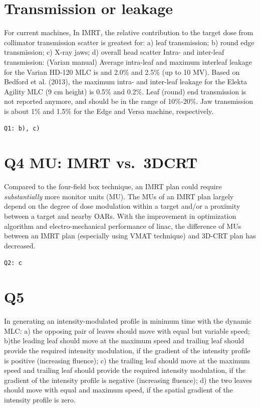 \documentclass[]{book}
\theoremstyle{definition}
\theoremstyle{definition}
\theoremstyle{definition}
\theoremstyle{remark}
\begin{document}
\section{Transmission or leakage}\label{transmission-or-leakage}

For current machines, In IMRT, the relative contribution to the target
dose from collimator transmission scatter is greatest for: a) leaf
transmission; b) round edge transmission; c) X-ray jaws; d) overall head
scatter Intra- and inter-leaf transmission: (Varian manual) Average
intra-leaf and maximum interleaf leakage for the Varian HD-120 MLC is
and 2.0\% and 2.5\% (up to 10 MV). Based on Bedford et al. (2013), the
maximum intra- and inter-leaf leakage for the Elekta Agility MLC (9 cm
height) is 0.5\% and 0.2\%. Leaf (round) end transmission is not
reported anymore, and should be in the range of 10\%-20\%. Jaw
transmission is about 1\% and 1.5\% for the Edge and Versa machine,
respectively.

\texttt{Q1:\ b),\ c)}

\section{Q4 MU: IMRT vs.~3DCRT}\label{q4-mu-imrt-vs.3dcrt}

Compared to the four-field box technique, an IMRT plan could require
\emph{substantially} more monitor units (MU). The MUs of an IMRT plan
largely depend on the degree of dose modulation within a target and/or a
proximity between a target and nearby OARs. With the improvement in
optimization algorithm and electro-mechanical performance of linac, the
difference of MUs between an IMRT plan (especially using VMAT technique)
and 3D-CRT plan has decreased.

\texttt{Q2:\ c}

\section{Q5}\label{q5}

In generating an intensity-modulated profile in minimum time with the
dynamic MLC: a) the opposing pair of leaves should move with equal but
variable speed; b)the leading leaf should move at the maximum speed and
trailing leaf should provide the required intensity modulation, if the
gradient of the intensity profile is positive (increasing fluence); c)
the trailing leaf should move at the maximum speed and trailing leaf
should provide the required intensity modulation, if the gradient of the
intensity profile is negative (increasing fluence); d) the two leaves
should move with equal and maximum speed, if the spatial gradient of the
intensity profile is zero.
\end{document}
